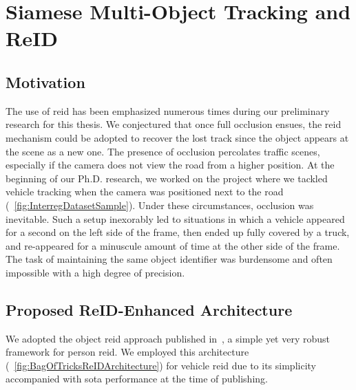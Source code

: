 \section{Siamese Multi-Object Tracking and ReID}
\label{sec:SiamMOTandReID}

\subsection{Motivation}

The use of \gls{reid} has been emphasized numerous times during our preliminary research for this thesis. We conjectured that once full occlusion ensues, the \gls{reid} mechanism could be adopted to recover the lost track since the object appears at the scene as a new one. The presence of occlusion percolates traffic scenes, especially if the camera does not view the road from a higher position. At the beginning of our Ph.D. research, we worked on the \interreg{} project where we tackled vehicle tracking when the camera was positioned next to the road (\figtext{}~\ref{fig:InterregDatasetSample}). Under these circumstances, occlusion was inevitable. Such a setup inexorably led to situations in which a vehicle appeared for a second on the left side of the frame, then ended up fully covered by a truck, and re-appeared for a minuscule amount of time at the other side of the frame. The task of maintaining the same object identifier was burdensome and often impossible with a high degree of precision.

\subsection{Proposed ReID-Enhanced Architecture}
\label{ssec:ProposedReIDEnhancedArchitecture}

We adopted the object \gls{reid} approach published in~\cite{luo2019bagoftricksreid}, a simple yet very robust framework for person \gls{reid}. We employed this architecture (\figtext{}~\ref{fig:BagOfTricksReIDArchitecture}) for vehicle \gls{reid} due to its simplicity accompanied with \gls{sota} performance at the time of publishing.

